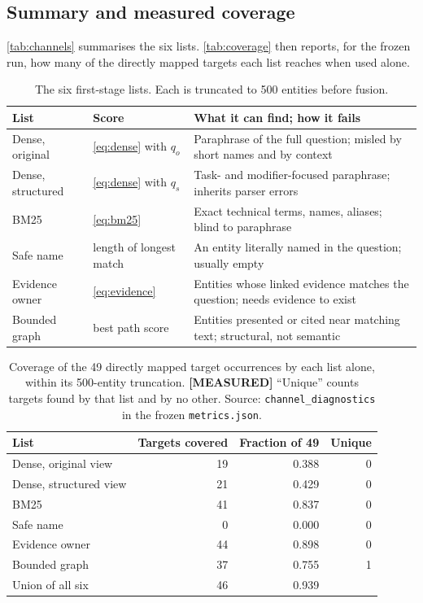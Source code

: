 \documentclass[11pt,a4paper]{article}
\newcommand{\cref}[1]{\autoref{#1}}
\newcommand{\Cref}[1]{\autoref{#1}}
\theoremstyle{remark}
\newcommand{\code}[1]{\texttt{\small #1}}
\newcommand{\vtag}[2]{{\sffamily\scriptsize\bfseries\textcolor{#1}{[#2]}}}
\newcommand{\Mtag}{\vtag{measgreen}{MEASURED}}
\begin{document}
\subsection{Summary and measured coverage}

\Cref{tab:channels} summarises the six lists. \Cref{tab:coverage} then reports, for the
frozen run, how many of the directly mapped targets each list reaches when used alone.

\begin{table}[!htbp]
\centering
\caption[The six first-stage lists]{The six first-stage lists. Each is truncated to 500 entities before fusion.}
\label{tab:channels}
\small
\begin{tabularx}{\linewidth}{p{2.7cm}p{4.3cm}X}
\toprule
List & Score & What it can find; how it fails\\
\midrule
Dense, original & \cref{eq:dense} with $q_o$ & Paraphrase of the full question; misled by
  short names and by context\\
Dense, structured & \cref{eq:dense} with $q_s$ & Task- and modifier-focused paraphrase;
  inherits parser errors\\
BM25 & \cref{eq:bm25} & Exact technical terms, names, aliases; blind to paraphrase\\
Safe name & length of longest match & An entity literally named in the question; usually
  empty\\
Evidence owner & \cref{eq:evidence} & Entities whose linked evidence matches the question;
  needs evidence to exist\\
Bounded graph & best path score & Entities presented or cited near matching text;
  structural, not semantic\\
\bottomrule
\end{tabularx}
\end{table}

\begin{table}[!htbp]
\centering
\caption[Measured coverage of mapped targets per list]{Coverage of the 49 directly mapped target occurrences by each list alone, within
its 500-entity truncation. \Mtag{} ``Unique'' counts targets found by that list and by no
other. Source: \code{channel\_diagnostics} in the frozen \code{metrics.json}.}
\label{tab:coverage}
\small
\begin{tabular}{lrrr}
\toprule
List & Targets covered & Fraction of 49 & Unique\\
\midrule
Dense, original view & 19 & 0.388 & 0\\
Dense, structured view & 21 & 0.429 & 0\\
BM25 & 41 & 0.837 & 0\\
Safe name & 0 & 0.000 & 0\\
Evidence owner & 44 & 0.898 & 0\\
Bounded graph & 37 & 0.755 & 1\\
\midrule
Union of all six & 46 & 0.939 & \\
\bottomrule
\end{tabular}
\end{table}
\end{document}
